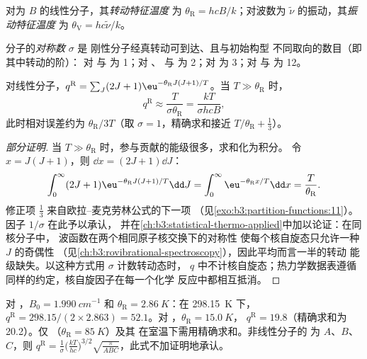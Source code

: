 \begin{definition}[特征温度]\label{def:b3:partition-functions:characteristic-temperature}
对为 $B$ 的线性分子，其\emph{转动特征温度}
为 $\theta_{\mathrm R} =
hcB/k$；对波数为 $\tilde\nu$ 的振动，其\emph{振动特征温度}
为 $\theta_{\mathrm V} =
hc\tilde\nu/k$。
\end{definition}

\begin{definition}[对称数]\label{def:b3:partition-functions:symmetry-number}
分子的\emph{对称数} $\sigma$ 是
刚性分子经真转动可到达、且与初始构型
不同取向的数目（即其中转动的阶）：
对  与  为 1；对 、
 与  为 2；对  为 3；对  与  为 12。
\end{definition}

\begin{proposition}[转动配分函数]\label{prop:b3:partition-functions:q-rot}
对线性分子，$q^{\mathrm R} = \sum_J(2J+1)\eu^{-\theta_{\mathrm R}J(J+1)/T}$。当 $T \gg
\theta_{\mathrm R}$ 时，
\[
  q^{\mathrm R} \approx \frac{T}{\sigma\theta_{\mathrm R}} = \frac{kT}{\sigma hcB},
\]
此时相对误差约为 $\theta_{\mathrm R}/3T$（取 $\sigma = 1$，精确求和接近
$T/\theta_{\mathrm R} + \frac13$）。
\end{proposition}

\begin{proof}[部分证明]
当 $T \gg \theta_{\mathrm R}$ 时，参与贡献的能级很多，求和化为积分。
令 $x = J(J+1)$，则 $\dd x = (2J+1)\dd J$：
\[
  \int_0^\infty(2J+1)\eu^{-\theta_{\mathrm R}J(J+1)/T}\dd J = \int_0^\infty\eu^{-\theta_{\mathrm R}x/T}\dd x
  = \frac{T}{\theta_{\mathrm R}}.
\]
修正项 $\frac13$ 来自欧拉–麦克劳林公式的下一项
（见\cref{exo:b3:partition-functions:11}）。因子 $1/\sigma$ 在此予以承认，
并在\cref{ch:b3:statistical-thermo-applied}中加以论证：在同核分子中，
波函数在两个相同原子核交换下的对称性
使每个核自旋态只允许一种 $J$ 的奇偶性
（见\cref{ch:b3:rovibrational-spectroscopy}），因此平均而言一半的转动
能级缺失。以这种方式用 $\sigma$ 计数转动态时，
$q$ 中不计核自旋态；热力学数据表遵循
同样的约定，核自旋因子在每一个化学
反应中都相互抵消。
\end{proof}

对 ，$B_0 = \qty{1.990}{cm^{-1}}$ 和 $\theta_{\mathrm R} = \qty{2.86}{K}$：在 \qty{298.15}{K} 下，
$q^{\mathrm R} = 298.15/(2\times2.863) = 52.1$。对 ，$\theta_{\mathrm R} = \qty{15.0}{K}$，
$q^{\mathrm R} = 19.8$（精确求和为 20.2）。仅 （$\theta_{\mathrm R} = \qty{85}{K}$）及其
在室温下需用精确求和。非线性分子的
为 $A$、$B$、$C$，则 $q^{\mathrm R} = \frac{1}{\sigma}\bigl(\frac{kT}{hc}\bigr)^{3/2}\sqrt{\frac{\pi}{ABC}}$，此式不加证明地承认。

